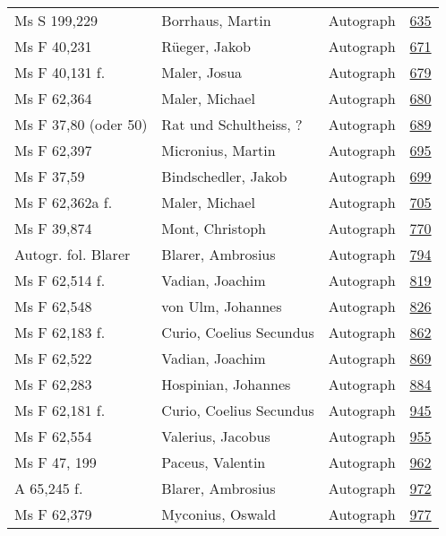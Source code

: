 \documentclass[10pt,a4paper,landscape]{report}
\begin{document}
\begin{longtable}{p{16cm}p{4cm}lr}
Ms S 199,229	&	Borrhaus, Martin	&	Autograph	&	\href{http://130.60.24.72/assignment/635}{635}\\
Ms F 40,231	&	Rüeger, Jakob	&	Autograph	&	\href{http://130.60.24.72/assignment/671}{671}\\
Ms F 40,131 f.	&	Maler, Josua	&	Autograph	&	\href{http://130.60.24.72/assignment/679}{679}\\
Ms F 62,364	&	Maler, Michael	&	Autograph	&	\href{http://130.60.24.72/assignment/680}{680}\\
Ms F 37,80 (oder 50)	&	Rat und Schultheiss, ?	&	Autograph	&	\href{http://130.60.24.72/assignment/689}{689}\\
Ms F 62,397	&	Micronius, Martin	&	Autograph	&	\href{http://130.60.24.72/assignment/695}{695}\\
Ms F 37,59	&	Bindschedler, Jakob	&	Autograph	&	\href{http://130.60.24.72/assignment/699}{699}\\
Ms F 62,362a f.	&	Maler, Michael	&	Autograph	&	\href{http://130.60.24.72/assignment/705}{705}\\
Ms F 39,874	&	Mont, Christoph	&	Autograph	&	\href{http://130.60.24.72/assignment/770}{770}\\
Autogr. fol. Blarer	&	Blarer, Ambrosius	&	Autograph	&	\href{http://130.60.24.72/assignment/794}{794}\\
Ms F 62,514 f.	&	Vadian, Joachim	&	Autograph	&	\href{http://130.60.24.72/assignment/819}{819}\\
Ms F 62,548	&	von Ulm, Johannes	&	Autograph	&	\href{http://130.60.24.72/assignment/826}{826}\\
Ms F 62,183 f.	&	Curio, Coelius Secundus	&	Autograph	&	\href{http://130.60.24.72/assignment/862}{862}\\
Ms F 62,522	&	Vadian, Joachim	&	Autograph	&	\href{http://130.60.24.72/assignment/869}{869}\\
Ms F 62,283	&	Hospinian, Johannes	&	Autograph	&	\href{http://130.60.24.72/assignment/884}{884}\\
Ms F 62,181 f.	&	Curio, Coelius Secundus	&	Autograph	&	\href{http://130.60.24.72/assignment/945}{945}\\
Ms F 62,554	&	Valerius, Jacobus	&	Autograph	&	\href{http://130.60.24.72/assignment/955}{955}\\
Ms F 47, 199	&	Paceus, Valentin	&	Autograph	&	\href{http://130.60.24.72/assignment/962}{962}\\
A 65,245 f.	&	Blarer, Ambrosius	&	Autograph	&	\href{http://130.60.24.72/assignment/972}{972}\\
Ms F 62,379	&	Myconius, Oswald	&	Autograph	&	\href{http://130.60.24.72/assignment/977}{977}\\

\end{longtable}
\end{document}

